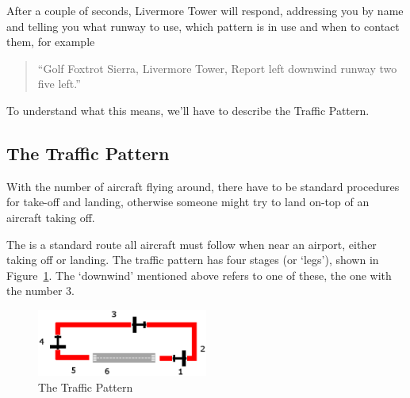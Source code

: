After a couple of seconds, Livermore Tower will respond, addressing you by name and 
telling you what runway to use, which pattern is in use and when to contact them, for example 

\begin{quote}
``Golf Foxtrot Sierra, Livermore Tower, Report left downwind runway two five left.''
\end{quote}

To understand what this means, we'll have to describe the Traffic Pattern.

\subsection{The Traffic Pattern}

With the number of aircraft flying around, there have to be standard procedures 
for take-off and landing, otherwise someone might try to land on-top of an aircraft taking off. 

The  is a standard route all aircraft must follow when 
near an airport, either taking off or landing. The traffic pattern has four 
stages (or `legs'), shown in Figure~\ref{pattern}. The `downwind' mentioned 
above refers to one of these, the one with the number 3.

\begin{figure}[!htp]
\centering
\includegraphics[width=0.5\textwidth]{pattern}
\caption{The Traffic Pattern\label{pattern}}
\end{figure}

